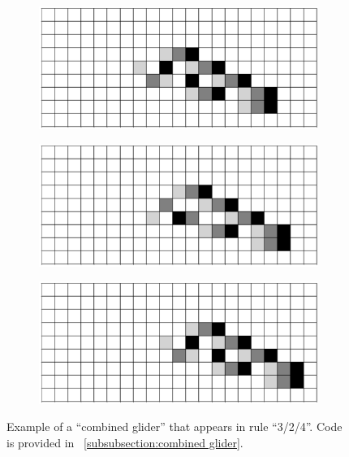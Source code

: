 \documentclass[12pt]{article}
\numberwithin{figure}{section} %
\begin{document}
\begin{figure}[H]
\begin{subfigure}{0.45\textwidth}
     		\subcaption{}
   	\end{subfigure}
    	\begin{subfigure}{0.45\textwidth}
     		\includegraphics[width=\linewidth]{Section4/35.9}
     		\subcaption{}
   	\end{subfigure}
	\newline
	\begin{subfigure}[t]{0.06\textwidth}
		\centering
		\phantom{H}
  	\end{subfigure}	
	\begin{subfigure}{0.45\textwidth}
     		\includegraphics[width=\linewidth]{Section4/35.10}
     		\subcaption{}
   	\end{subfigure}
    	\begin{subfigure}{0.45\textwidth}
     		\includegraphics[width=\linewidth]{Section4/35.11}
     		\subcaption{}
   	\end{subfigure}
   	\caption[Example of a "combined glider"]{Example of a “combined glider” that appears in rule “3/2/4”. Code is provided in ~\ref{subsubsection:combined glider}.}
   	\label{fig:combined glider}
\end{figure}
\end{document}
